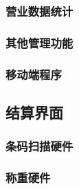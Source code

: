 \subsubsection{营业数据统计}

\subsubsection{其他管理功能}

\subsubsection{移动端程序}

\subsection{结算界面}

\subsubsection{条码扫描硬件}

\subsubsection{称重硬件}